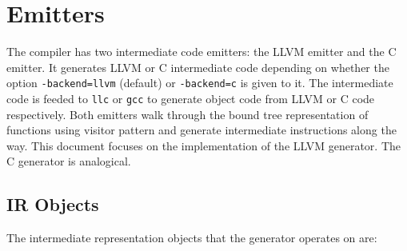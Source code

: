 \documentclass[a4paper,oneside,11pt]{book}
\theoremstyle{definition}
\begin{document}
\chapter{Emitters}

The compiler has two intermediate code emitters: the LLVM emitter and the C emitter.
It generates LLVM or C intermediate code depending on whether the option \verb|-backend=llvm| (default) or \verb|-backend=c| is given to it.
The intermediate code is feeded to \verb|llc| or \verb|gcc| to generate object code from LLVM or C code respectively.
Both emitters walk through the bound tree representation of functions using visitor pattern and generate intermediate instructions along the way.
This document focuses on the implementation of the LLVM generator. The C generator is analogical.

\section{IR Objects}

The intermediate representation objects that the generator operates on are:
\end{document}
